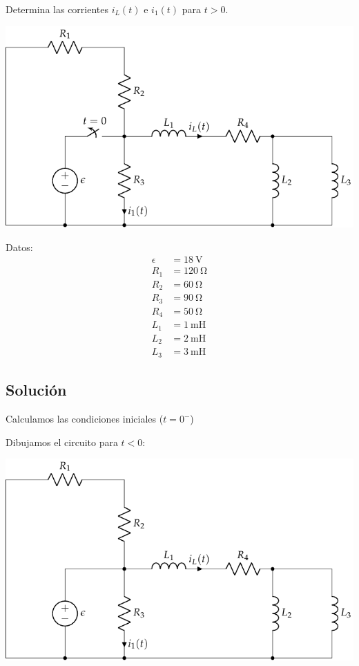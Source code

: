 Determina las corrientes $i_L(t)$ e $i_1(t)$ para $t > 0$.

\begin{minipage}{0.7\textwidth}
  \includegraphics{figuras/HKD84}
\end{minipage}
\hfill
\begin{minipage}{0.3\textwidth}
  Datos:
  \begin{align*}
    \epsilon &= \SI{18}{\volt}\\
    R_1 &= \SI{120}{\ohm}\\
    R_2 &= \SI{60}{\ohm}\\
    R_3 &= \SI{90}{\ohm}\\
    R_4 &= \SI{50}{\ohm}\\
    L_1 &= \SI{1}{\milli\henry}\\
    L_2 &= \SI{2}{\milli\henry}\\
    L_3 &= \SI{3}{\milli\henry}
  \end{align*}
\end{minipage}

\subsection*{Solución}

Calculamos las condiciones iniciales ($t = 0^-$)

Dibujamos el circuito para $t < 0$:

\begin{center}
  \includegraphics[scale=0.85]{figuras/HKD84_t0-}
\end{center}

